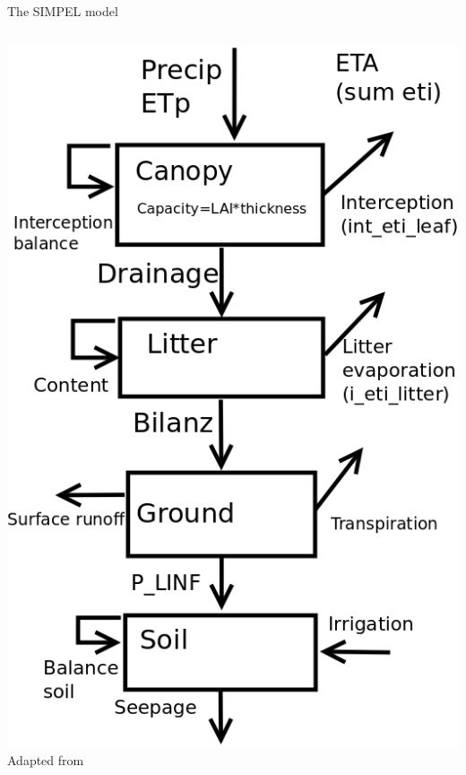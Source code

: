 \documentclass{beamer}
\begin{document}
\begin{frame}{The SIMPEL model}
\begin{columns}
\begin{column}{0.5\textwidth}
 \includegraphics[scale=0.30]{Simpel_diagram2.png}\\
{\scriptsize Adapted from \cite{hormann_comparison_2007}}
\end{column}

\end{columns}




\end{frame}
\end{document}

